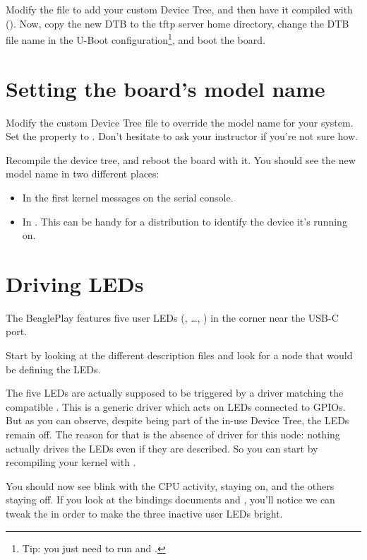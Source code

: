 Modify the  file to add your custom
Device Tree, and then have it compiled with (). Now,
copy the new DTB to the tftp server home directory, change the DTB file
name in the U-Boot configuration\footnote{Tip: you just need to run
 and .}, and boot the board.

\section{Setting the board's model name}

Modify the custom Device Tree file to override the model name for your
system. Set the  property to . Don't hesitate to ask your instructor if you're not sure how.

Recompile the device tree, and reboot the board with it. You should see
the new model name in two different places:

\begin{itemize}
\item In the first kernel messages on the serial console.
\item In . This can be
      handy for a distribution to identify the device it's running on.
\end{itemize}

\section{Driving LEDs}

The BeaglePlay features five user LEDs (, \ldots, )
in the corner near the USB-C port.

Start by looking at the different description files and look for a node
that would be defining the LEDs.

The five LEDs are actually supposed to be triggered by a driver matching
the compatible . This is a generic driver which acts on
LEDs connected to GPIOs. But as you can observe, despite being part of
the in-use Device Tree, the LEDs remain off. The reason for that is the
absence of driver for this node: nothing actually drives the LEDs even
if they are described. So you can start by recompiling your kernel with
.

You should now see  blink with the CPU activity, 
staying on, and the others staying off. If you look at the bindings documents
 and
, you'll notice we
can tweak the  in order to make the three inactive user
LEDs bright.


